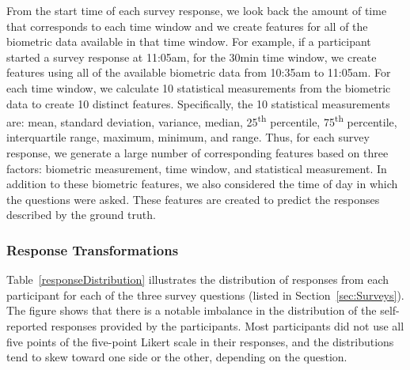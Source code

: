 From the start time of each survey response, we look back the amount of time 
that corresponds to each time window and we create features for all of the 
biometric data available in that time window. For example, if a participant 
started a survey response at 11:05am, for the 30min time window, we create 
features using all of the available biometric data from 10:35am to 11:05am. 
For each time window, we calculate 10 statistical measurements from the 
biometric data to create 10 distinct features. Specifically, the 10 
statistical measurements are: mean, standard deviation, variance, median, 
25\textsuperscript{th} percentile, 75\textsuperscript{th} percentile, interquartile range, maximum, minimum, and 
range. Thus, for each survey response, we generate a large number of 
corresponding features based on three factors: biometric measurement, time 
window, and statistical measurement. In addition to these biometric 
features, we also considered the time of day in which the questions were 
asked. These features are created to predict the responses described by the 
ground truth. 

\subsubsection{Response Transformations}
Table~\ref{responseDistribution} illustrates the distribution of responses from each participant for each of the three survey questions (listed in Section~\ref{sec:Surveys}). The figure shows that there is a notable imbalance in the distribution of the self-reported responses provided by the participants. Most participants did not use all five points of the five-point Likert scale in their responses, and the distributions tend to skew toward one side or the other, depending on the question. 

